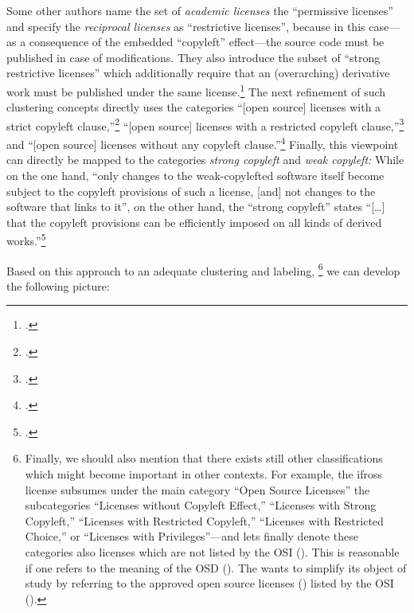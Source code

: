 Some other authors name the set of \emph{academic licenses} the
\enquote{permissive licenses} and specify the \emph{reciprocal licenses} as
\enquote{restrictive licenses}, because in this case---as a consequence of the
embedded \enquote{copyleft} effect---the source code must be published in case
of modifications. They also introduce the subset of \enquote{strong
restrictive licenses} which additionally require that an (overarching)
derivative work must be published under the same license.\footcite[pars pro toto
cf.][57]{Buchtala2007a} The next refinement of such clustering concepts
directly uses the categories \enquote{[open source] licenses with a strict
copyleft clause,}\footcite[Originally stated as \enquote{Lizenzen mit einer
strengen Copyleft-Klausel.} Cf.][24]{JaeMet2011a} \enquote{[open source]
licenses with a restricted copyleft clause,}\footcite[Originally stated as
\enquote{Lizenzen mit einer beschränkten Copyleft-Klausel.}
Cf.][71]{JaeMet2011a} and \enquote{[open source] licenses without any copyleft
clause.}\footcite[Originally stated as \enquote{Lizenzen ohne Copyleft-Klausel.}
Cf.][83]{JaeMet2011a} Finally, this viewpoint can directly be mapped to the
categories \emph{strong copyleft} and \emph{weak copyleft:} While on the one
hand, \enquote{only changes to the weak-copylefted software itself become
subject to the copyleft provisions of such a license, [and] not changes to the
software that links to it}, on the other hand, the \enquote{strong copyleft}
states \enquote{[\ldots] that the copyleft provisions can be efficiently imposed
on all kinds of derived works.}\footcite[cf.][\nopage wp]{wpCopyleft2013a}

Based on this approach to an adequate clustering and labeling,%
  \footnote{Finally, we should also mention that there exists still other
  classifications which might become important in other contexts. For example,
  the ifross license subsumes under the main category \enquote{Open Source
  Licenses} the subcategories \enquote{Licenses without Copyleft Effect,}
  \enquote{Licenses with Strong Copyleft,} \enquote{Licenses with Restricted
  Copyleft,} \enquote{Licenses with Restricted Choice,} or \enquote{Licenses
  with Privileges}---and lets finally denote these categories also licenses
  which are not listed by the OSI (\cite[cf.][\nopage wp]{ifross2011a}). This is
  reasonable if one refers to the meaning of the OSD (\cite[cf.][\nopage
  wp]{OSI2012a}). The \oslic{} wants to simplify its object of study by
  referring to the approved open source licenses (\cite[cf.][\nopage
    wp]{OSI2012d}) listed by the OSI (\cite[cf.][\nopage wp]{OSI2012b}).}
we can develop the following picture:

